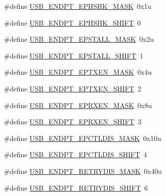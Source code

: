 \begin{DoxyCompactItemize}
\item 
\#define \hyperlink{group___u_s_b___register___masks_ga9266b40af26177a6659041e0229e76e7}{U\+S\+B\+\_\+\+E\+N\+D\+P\+T\+\_\+\+E\+P\+H\+S\+H\+K\+\_\+\+M\+A\+SK}~0x1u
\item 
\#define \hyperlink{group___u_s_b___register___masks_ga477c6b1ea91137b6ebd65d0574a7b611}{U\+S\+B\+\_\+\+E\+N\+D\+P\+T\+\_\+\+E\+P\+H\+S\+H\+K\+\_\+\+S\+H\+I\+FT}~0
\item 
\#define \hyperlink{group___u_s_b___register___masks_ga57a65ef14a5d868dcd964177fe6daad2}{U\+S\+B\+\_\+\+E\+N\+D\+P\+T\+\_\+\+E\+P\+S\+T\+A\+L\+L\+\_\+\+M\+A\+SK}~0x2u
\item 
\#define \hyperlink{group___u_s_b___register___masks_ga38af6f0d87e04be4f9f19cca981765cb}{U\+S\+B\+\_\+\+E\+N\+D\+P\+T\+\_\+\+E\+P\+S\+T\+A\+L\+L\+\_\+\+S\+H\+I\+FT}~1
\item 
\#define \hyperlink{group___u_s_b___register___masks_ga3d498f31497071c5ff6ad30e89b7c26e}{U\+S\+B\+\_\+\+E\+N\+D\+P\+T\+\_\+\+E\+P\+T\+X\+E\+N\+\_\+\+M\+A\+SK}~0x4u
\item 
\#define \hyperlink{group___u_s_b___register___masks_gad281aa3cd601a2a93f60e0145dd8e564}{U\+S\+B\+\_\+\+E\+N\+D\+P\+T\+\_\+\+E\+P\+T\+X\+E\+N\+\_\+\+S\+H\+I\+FT}~2
\item 
\#define \hyperlink{group___u_s_b___register___masks_ga80f33455bd11aa0be5cd5d876ab48228}{U\+S\+B\+\_\+\+E\+N\+D\+P\+T\+\_\+\+E\+P\+R\+X\+E\+N\+\_\+\+M\+A\+SK}~0x8u
\item 
\#define \hyperlink{group___u_s_b___register___masks_gaeba041e492aca9bfbdbc90584e00cba9}{U\+S\+B\+\_\+\+E\+N\+D\+P\+T\+\_\+\+E\+P\+R\+X\+E\+N\+\_\+\+S\+H\+I\+FT}~3
\item 
\#define \hyperlink{group___u_s_b___register___masks_ga07f43f2be7e974a763e86087f47e14d6}{U\+S\+B\+\_\+\+E\+N\+D\+P\+T\+\_\+\+E\+P\+C\+T\+L\+D\+I\+S\+\_\+\+M\+A\+SK}~0x10u
\item 
\#define \hyperlink{group___u_s_b___register___masks_ga0607b1ed419fd16c0c3635042ff33fd4}{U\+S\+B\+\_\+\+E\+N\+D\+P\+T\+\_\+\+E\+P\+C\+T\+L\+D\+I\+S\+\_\+\+S\+H\+I\+FT}~4
\item 
\#define \hyperlink{group___u_s_b___register___masks_ga116b045c1163bccc05a270beb6ee2f3d}{U\+S\+B\+\_\+\+E\+N\+D\+P\+T\+\_\+\+R\+E\+T\+R\+Y\+D\+I\+S\+\_\+\+M\+A\+SK}~0x40u
\item 
\#define \hyperlink{group___u_s_b___register___masks_ga7d07ae7b5369ee4cbfa19194ebc2e143}{U\+S\+B\+\_\+\+E\+N\+D\+P\+T\+\_\+\+R\+E\+T\+R\+Y\+D\+I\+S\+\_\+\+S\+H\+I\+FT}~6
\item 

\end{DoxyCompactItemize}
